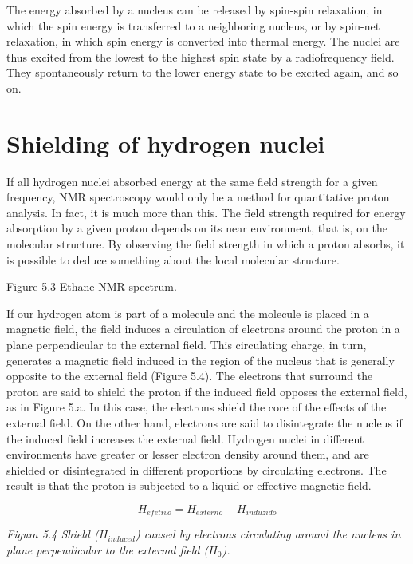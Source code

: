 The energy absorbed by a nucleus can be released by spin-spin relaxation, in which the spin energy is transferred to a neighboring nucleus, or by spin-net relaxation, in which spin energy is converted into thermal energy. The nuclei are thus excited from the lowest to the highest spin state by a radiofrequency field. They spontaneously return to the lower energy state to be excited again, and so on.

\section{Shielding of hydrogen nuclei}
If all hydrogen nuclei absorbed energy at the same field strength for a given frequency, NMR spectroscopy would only be a method for quantitative proton analysis. In fact, it is much more than this. The field strength required for energy absorption by a given proton depends on its near environment, that is, on the molecular structure. By observing the field strength in which a proton absorbs, it is possible to deduce something about the local molecular structure.

Figure 5.3 Ethane NMR spectrum.

If our hydrogen atom is part of a molecule and the molecule is placed in a magnetic field, the field induces a circulation of electrons around the proton in a plane perpendicular to the external field. This circulating charge, in turn, generates a magnetic field induced in the region of the nucleus that is generally opposite to the external field (Figure 5.4). The electrons that surround the proton are said to shield the proton if the induced field opposes the external field, as in Figure 5.a. In this case, the electrons shield the core of the effects of the external field. On the other hand, electrons are said to disintegrate the nucleus if the induced field increases the external field. Hydrogen nuclei in different environments have greater or lesser electron density around them, and are shielded or disintegrated in different proportions by circulating electrons. The result is that the proton is subjected to a liquid or effective magnetic field.

\begin{equation}
H_{efetivo} = H_{externo}-H_{induzido}
\end{equation}

\emph{Figura 5.4 Shield ($H_{induced}$) caused by electrons circulating around the nucleus in plane perpendicular to the external field ($H_0$).}

